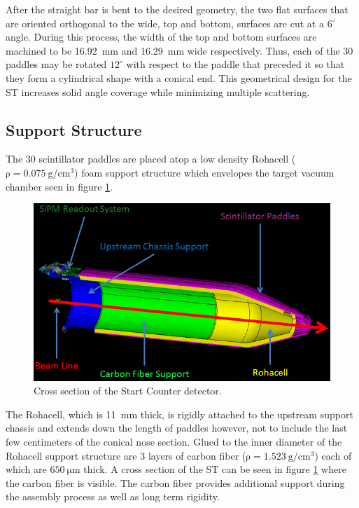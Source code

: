 After the straight bar is bent to the desired geometry, the two flat surfaces that are oriented orthogonal to the wide, top and bottom, surfaces are cut at a $6^{\circ}$ angle.  During this process, the width of the top and bottom surfaces are machined to be 16.92~mm and 16.29~mm wide respectively.  Thus, each of the 30 paddles may be rotated $12^{\circ}$ with respect to the paddle that preceded it so that they form a cylindrical shape with a conical end.  This geometrical design for the ST increases solid angle coverage while minimizing multiple scattering.  

\subsection{Support Structure}

The 30 scintillator paddles are placed atop a low density Rohacell ($\mathrm{\rho = 0.075\ g/cm^{3}}$) foam support structure which envelopes the target vacuum chamber seen in figure \ref{fig:ST_Cross_Section}.  
\begin{figure}[!htb]
	\centering
	\includegraphics[width=1.0\columnwidth]{design/figs/ST_Cross_Section}
	\caption[Cross section of the Start Counter detector]{Cross section of the Start Counter detector.}
	\label{fig:ST_Cross_Section}
\end{figure}
The Rohacell, which is 11~mm thick, is rigidly attached to the upstream support chassis and extends down the length of paddles however, not to include the last few centimeters of the conical nose section.  Glued to the inner diameter of the Rohacell support structure are 3 layers of carbon fiber ($\mathrm{\rho = 1.523\ g/cm^{3}}$) each of which are $\mathrm{650\ \mu m}$ thick.  A cross section of the ST can be seen in figure \ref{fig:ST_Cross_Section} where the carbon fiber is visible.  The carbon fiber provides additional support during the assembly process as well as long term rigidity.  


